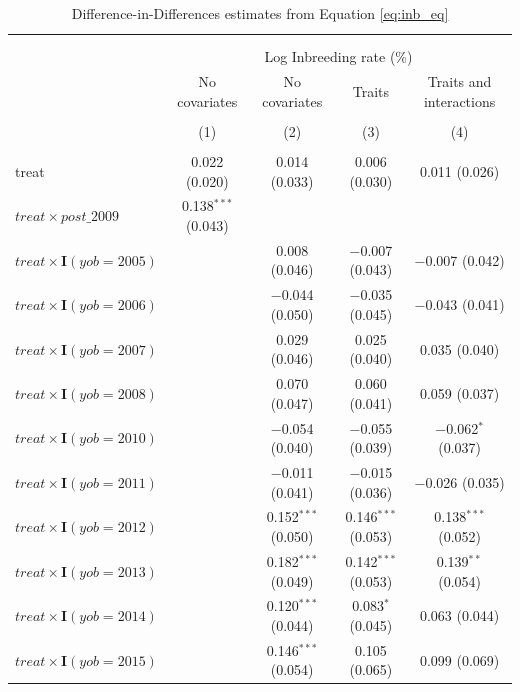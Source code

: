 
\begin{table}[H] \centering 
  \caption{Difference-in-Differences estimates from Equation \ref{eq:inb_eq}} 
  \label{tab:table2} 
\small 
\begin{tabular}{@{\extracolsep{5pt}}lcccc} 
\\[-1.8ex]\hline 
\hline \\[-1.8ex] 
\\[-1.8ex] & \multicolumn{4}{c}{Log Inbreeding rate (\%)} \\ 
 & No covariates & No covariates & Traits & Traits and interactions \\ 
\\[-1.8ex] & (1) & (2) & (3) & (4)\\ 
\hline \\[-1.8ex] 
 treat & 0.022 (0.020) & 0.014 (0.033) & 0.006 (0.030) & 0.011 (0.026) \\ 
  $treat \times post\_2009$ & 0.138$^{***}$ (0.043) &  &  &  \\ 
  $treat \times\mathbf{I}(yob=2005)$ &  & 0.008 (0.046) & $-$0.007 (0.043) & $-$0.007 (0.042) \\ 
  $treat \times\mathbf{I}(yob=2006)$ &  & $-$0.044 (0.050) & $-$0.035 (0.045) & $-$0.043 (0.041) \\ 
  $treat \times\mathbf{I}(yob=2007)$ &  & 0.029 (0.046) & 0.025 (0.040) & 0.035 (0.040) \\ 
  $treat \times\mathbf{I}(yob=2008)$ &  & 0.070 (0.047) & 0.060 (0.041) & 0.059 (0.037) \\ 
  $treat \times\mathbf{I}(yob=2010)$ &  & $-$0.054 (0.040) & $-$0.055 (0.039) & $-$0.062$^{*}$ (0.037) \\ 
  $treat \times\mathbf{I}(yob=2011)$ &  & $-$0.011 (0.041) & $-$0.015 (0.036) & $-$0.026 (0.035) \\ 
  $treat \times\mathbf{I}(yob=2012)$ &  & 0.152$^{***}$ (0.050) & 0.146$^{***}$ (0.053) & 0.138$^{***}$ (0.052) \\ 
  $treat \times\mathbf{I}(yob=2013)$ &  & 0.182$^{***}$ (0.049) & 0.142$^{***}$ (0.053) & 0.139$^{**}$ (0.054) \\ 
  $treat \times\mathbf{I}(yob=2014)$ &  & 0.120$^{***}$ (0.044) & 0.083$^{*}$ (0.045) & 0.063 (0.044) \\ 
  $treat \times\mathbf{I}(yob=2015)$ &  & 0.146$^{***}$ (0.054) & 0.105 (0.065) & 0.099 (0.069) \\ 

\end{tabular}
\end{table}
